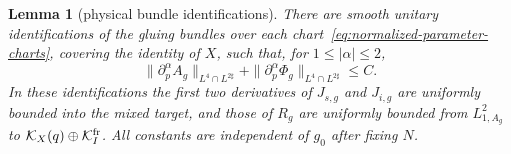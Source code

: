 \documentclass[11pt]{amsart}
\newtheorem{lemma}[theorem]{Lemma}
\theoremstyle{definition}
\theoremstyle{remark}
\theoremstyle{plain}
\newcommand{\cK}{\mathcal{K}}
\begin{document}
\begin{lemma}[physical bundle identifications]\label{lem:parameter-transport}
There are smooth unitary identifications of the gluing bundles over each
chart~\eqref{eq:normalized-parameter-charts}, covering the identity of $X$,
such that, for $1\leq|\alpha|\leq2$,
\begin{equation}\label{eq:parameter-coefficients}
 \|\partial_p^\alpha A_g\|_{L^4\cap L^{2\sharp}}
 +\|\partial_p^\alpha\Phi_g\|_{L^4\cap L^{2\sharp}}\leq C.
\end{equation}
In these identifications the first two derivatives of $J_{s,g}$ and
$J_{i,g}$ are uniformly bounded into the mixed target, and those of
$R_g$ are uniformly bounded from $L^2_{1,A_g}$ to
$\cK_X(q)\oplus\cK_I^{\rm fr}$.  All constants are independent of
$g_0$ after fixing $N$.
\end{lemma}
\end{document}
